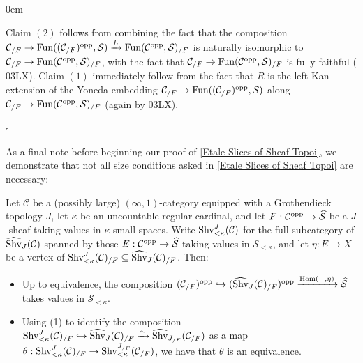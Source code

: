 \documentclass[10pt]{article}
\newcommand{\mS}{\mathcal S}
\newcommand{\C}{\mathcal C}
\renewcommand{\qed}{\hfill$\square$}
\renewenvironment{proof}{\begin{addmargin}[1em]{0em}\begin{newproof}}{\end{newproof}\end{addmargin}\qed}
\theoremstyle{witharg}
\theoremstyle{witharg}
\theoremstyle{witharg2}
\begin{document}
\begin{proof}
\begin{itemize}
        
        
    \end{itemize}

    \noindent Claim $(2)$ follows from combining the fact that the composition $\C_{/F}\rightarrow \textnormal{Fun}((\C_{/F})^{\textnormal{opp}},\mS)\xrightarrow{L}\textnormal{Fun}(\C^{\textnormal{opp}},\mS)_{/F}$ is naturally isomorphic to $\C_{/F}\rightarrow \textnormal{Fun}(\C^{\textnormal{opp}},\mS)_{/F}$, with the fact that $\C_{/F}\rightarrow \textnormal{Fun}(\C^{\textnormal{opp}},\mS)_{/F}$ is fully faithful ( 03LX). Claim $(1)$ immediately follow from the fact that $R$ is the left Kan extension of the Yoneda embedding $\C_{/F}\rightarrow \textnormal{Fun}((\C_{/F})^{\textnormal{opp}},\mS)$ along $\C_{/F}\rightarrow \textnormal{Fun}(\C^{\textnormal{opp}},\mS)_{/F}$ (again by  03LX).
    
    
    
\end{proof}



\noindent As a final note before beginning our proof of \ref{Etale Slices of Sheaf Topoi}, we demonstrate that not all size conditions asked in \ref{Etale Slices of Sheaf Topoi} are necessary:

\begin{proposition}{}\label{Etale Slices of Sheaf Topoi With no Size Conditions}

    Let $\C$ be a (possibly large) $(\infty,1)$-category equipped with a Grothendieck topology $J$, let $\kappa$ be an uncountable regular cardinal, and let $F:\C^{\textnormal{opp}}\rightarrow \widehat{\mS}$ be a $J$-sheaf taking values in $\kappa$-small spaces. Write $\textnormal{Shv}^J_{<\kappa}(\C)$ for the full subcategory of $\widehat{\textnormal{Shv}}_J(\C)$ spanned by those $E:\C^{\textnormal{opp}}\rightarrow \widehat{\mS}$ taking values in $\mS_{<\kappa}$, and let $\eta:E\rightarrow X$ be a vertex of $\textnormal{Shv}^J_{<\kappa}(\C)_{/F}\subseteq \widehat{\textnormal{Shv}}_J(\C)_{/F}$. Then:

    \begin{itemize}
    
        \item [$(1)$] Up to equivalence, the composition $(\C_{/F})^\textnormal{opp}\hookrightarrow (\widehat{\textnormal{Shv}}_J(\C)_{/F})^\textnormal{opp}\xrightarrow{\textnormal{Hom}(-,\eta)}\widehat{\mS}$ takes values in $\mS_{<\kappa}$. 

        \item [$(2)$] Using (1) to identify the composition $\textnormal{Shv}^J_{<\kappa}(\C)_{/F}\hookrightarrow \widehat{\textnormal{Shv}}_J(\C)_{/F}\xrightarrow{\sim}\widehat{\textnormal{Shv}}_{J_{/F}}(\C_{/F})$ as a map $\theta:\textnormal{Shv}^J_{<\kappa}(\C)_{/F}\rightarrow \textnormal{Shv}^{J_{/F}}_{<\kappa}(\C_{/F})$, we have that $\theta$ is an equivalence.
        
    \end{itemize}

    
\end{proposition}
\end{document}
